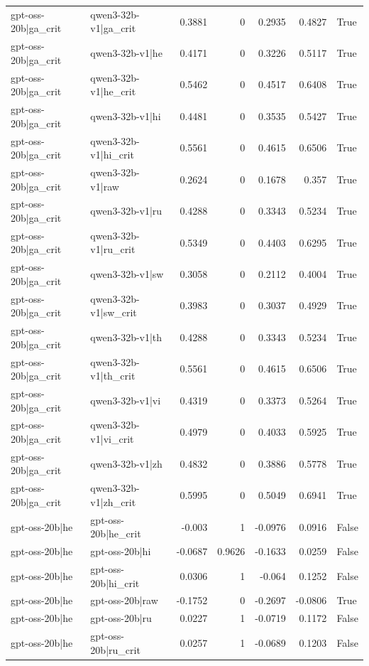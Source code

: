 \begin{table}
\begin{tabular}{l l r r r r l}
gpt-oss-20b|ga_crit & qwen3-32b-v1|ga_crit & 0.3881 & 0 & 0.2935 & 0.4827 & True \\
gpt-oss-20b|ga_crit & qwen3-32b-v1|he & 0.4171 & 0 & 0.3226 & 0.5117 & True \\
gpt-oss-20b|ga_crit & qwen3-32b-v1|he_crit & 0.5462 & 0 & 0.4517 & 0.6408 & True \\
gpt-oss-20b|ga_crit & qwen3-32b-v1|hi & 0.4481 & 0 & 0.3535 & 0.5427 & True \\
gpt-oss-20b|ga_crit & qwen3-32b-v1|hi_crit & 0.5561 & 0 & 0.4615 & 0.6506 & True \\
gpt-oss-20b|ga_crit & qwen3-32b-v1|raw & 0.2624 & 0 & 0.1678 & 0.357 & True \\
gpt-oss-20b|ga_crit & qwen3-32b-v1|ru & 0.4288 & 0 & 0.3343 & 0.5234 & True \\
gpt-oss-20b|ga_crit & qwen3-32b-v1|ru_crit & 0.5349 & 0 & 0.4403 & 0.6295 & True \\
gpt-oss-20b|ga_crit & qwen3-32b-v1|sw & 0.3058 & 0 & 0.2112 & 0.4004 & True \\
gpt-oss-20b|ga_crit & qwen3-32b-v1|sw_crit & 0.3983 & 0 & 0.3037 & 0.4929 & True \\
gpt-oss-20b|ga_crit & qwen3-32b-v1|th & 0.4288 & 0 & 0.3343 & 0.5234 & True \\
gpt-oss-20b|ga_crit & qwen3-32b-v1|th_crit & 0.5561 & 0 & 0.4615 & 0.6506 & True \\
gpt-oss-20b|ga_crit & qwen3-32b-v1|vi & 0.4319 & 0 & 0.3373 & 0.5264 & True \\
gpt-oss-20b|ga_crit & qwen3-32b-v1|vi_crit & 0.4979 & 0 & 0.4033 & 0.5925 & True \\
gpt-oss-20b|ga_crit & qwen3-32b-v1|zh & 0.4832 & 0 & 0.3886 & 0.5778 & True \\
gpt-oss-20b|ga_crit & qwen3-32b-v1|zh_crit & 0.5995 & 0 & 0.5049 & 0.6941 & True \\
gpt-oss-20b|he & gpt-oss-20b|he_crit & -0.003 & 1 & -0.0976 & 0.0916 & False \\
gpt-oss-20b|he & gpt-oss-20b|hi & -0.0687 & 0.9626 & -0.1633 & 0.0259 & False \\
gpt-oss-20b|he & gpt-oss-20b|hi_crit & 0.0306 & 1 & -0.064 & 0.1252 & False \\
gpt-oss-20b|he & gpt-oss-20b|raw & -0.1752 & 0 & -0.2697 & -0.0806 & True \\
gpt-oss-20b|he & gpt-oss-20b|ru & 0.0227 & 1 & -0.0719 & 0.1172 & False \\
gpt-oss-20b|he & gpt-oss-20b|ru_crit & 0.0257 & 1 & -0.0689 & 0.1203 & False \\

\end{tabular}
\end{table}
